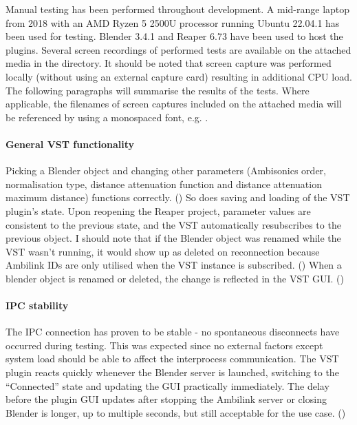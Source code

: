 Manual testing has been performed throughout development. A mid-range laptop from 2018 with an AMD Ryzen 5 2500U processor running Ubuntu 22.04.1 
has been used for testing. Blender 3.4.1 and Reaper 6.73 have been used to host the plugins.
Several screen recordings of performed tests are available on the attached media in the  directory.
It should be noted that screen capture was performed locally (without using an external capture card) resulting in additional CPU load.
The following paragraphs will summarise the results of the tests. Where applicable, the filenames of screen captures included on the attached
media will be referenced by using a monospaced font, e.g. .

\paragraph*{General VST functionality}
Picking a Blender object and changing other parameters (Ambisonics order,
normalisation type, distance attenuation function and distance attenuation maximum distance) functions correctly. 
()
So does saving and loading of the VST plugin's state. 
Upon reopening the Reaper project,
parameter values are consistent to the previous state, and the VST automatically resubscribes 
to the previous object. I should note that if the Blender object was renamed while the VST wasn't running,
it would show up as deleted on reconnection because Ambilink IDs are only utilised when the VST instance is subscribed.
()
When a blender object is renamed or deleted, the change is reflected in the VST GUI. ()

\paragraph*{IPC stability}
The IPC connection has proven to be stable - no spontaneous disconnects have occurred during testing.
This was expected since no external factors except system load should be able to affect the interprocess communication.
The VST plugin reacts quickly whenever the Blender server is launched, switching to the ``Connected'' state and updating the GUI
practically immediately. The delay before the plugin GUI updates after stopping the Ambilink server or closing Blender is longer, 
up to multiple seconds, but still acceptable for the use case. ()

